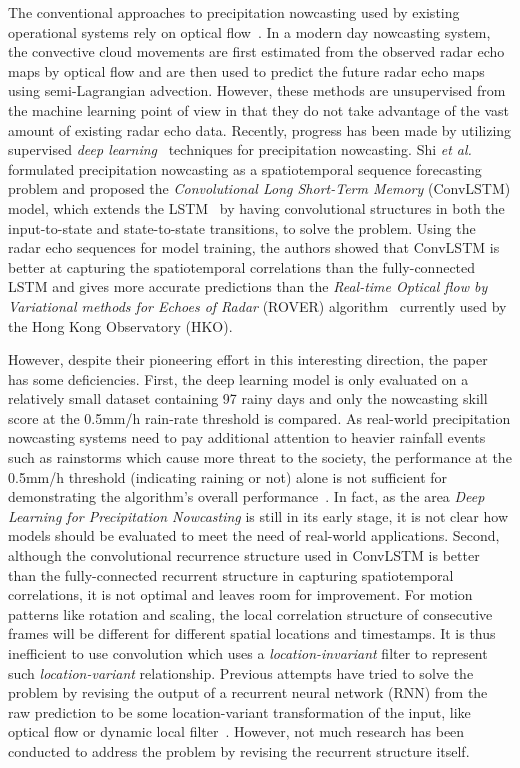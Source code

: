 \documentclass{article}
\begin{document}
The conventional approaches to precipitation nowcasting used by existing
operational systems rely on optical flow~\cite{woo2017operational}. In a modern day nowcasting system, the convective cloud movements are first estimated from the observed radar echo maps
by optical flow and are then used to predict the future radar echo maps using semi-Lagrangian
advection. However, these methods are unsupervised from the machine learning
point of view in that they do not take advantage of the vast amount of existing
radar echo data. Recently, progress has been made by utilizing supervised
\emph{deep learning}~\cite{lecun2015deep} techniques for precipitation
nowcasting. Shi \emph{et al.}~\cite{xingjian2015convolutional} formulated
precipitation nowcasting as a spatiotemporal sequence forecasting problem and
proposed the \emph{Convolutional Long Short-Term Memory} (ConvLSTM) model, which
extends the LSTM~\cite{hochreiter1997long} by having convolutional structures in
both the input-to-state and state-to-state transitions, to solve the problem.
Using the radar echo sequences for model training, the authors showed that
ConvLSTM is better at capturing the spatiotemporal correlations than the
fully-connected LSTM and gives more accurate predictions than the
\emph{Real-time Optical flow by Variational methods for Echoes of Radar} (ROVER)
algorithm~\cite{woo2017operational} currently used by the Hong Kong
Observatory (HKO).

However, despite their pioneering effort in this interesting
direction, the paper has some deficiencies. First, the deep learning model is
only evaluated on a relatively small dataset containing 97 rainy days and only
the nowcasting skill score at the 0.5mm/h rain-rate threshold is compared. As
real-world precipitation nowcasting systems need to pay additional attention to
heavier rainfall events such as rainstorms which cause more threat to the
society, the performance at the 0.5mm/h threshold (indicating raining or not)
alone is not sufficient for demonstrating the algorithm's overall
performance~\cite{woo2017operational}. In fact, as the area \emph{Deep
  Learning for Precipitation Nowcasting} is still in its early stage, it is not
clear how models should be evaluated to meet the need of real-world
applications. Second, although the convolutional recurrence structure used in
ConvLSTM is better than the fully-connected recurrent structure in capturing
spatiotemporal correlations, it is not optimal and leaves room for improvement. For
motion patterns like rotation and scaling, the local correlation structure of
consecutive frames will be different for different spatial locations and
timestamps. It is thus inefficient to use convolution which uses a
\emph{location-invariant} filter to represent such \emph{location-variant}
relationship. Previous attempts have tried to solve the problem by revising the
output of a recurrent neural network (RNN) from the raw prediction to be some
location-variant transformation of the input, like optical flow or dynamic local
filter~\cite{finn2016unsupervised,de2016dynamic}. However, not much research has
been conducted to address the problem by revising the recurrent structure
itself.
\end{document}
